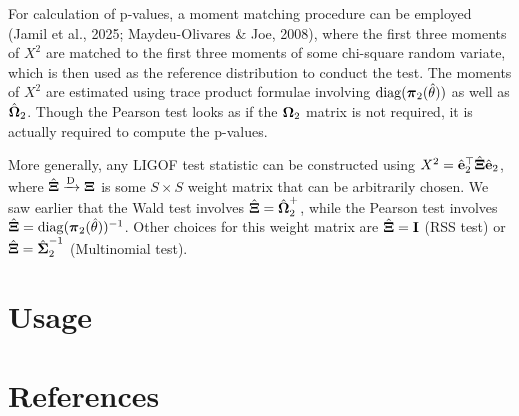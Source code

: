 \documentclass[
  letterpaper,
  DIV=11,
  numbers=noendperiod]{scrartcl}
\begin{document}
For calculation of p-values, a moment matching procedure can be employed
(Jamil et al., 2025; Maydeu-Olivares \& Joe, 2008), where the first
three moments of \(X^2\) are matched to the first three moments of some
chi-square random variate, which is then used as the reference
distribution to conduct the test. The moments of \(X^2\) are estimated
using trace product formulae involving \(\operatorname{diag}({\boldsymbol\pi}_2(\hat\theta))\) as
well as \(\hat{{\boldsymbol\Omega}}_2\). Though the Pearson test looks as if the
\({\boldsymbol\Omega}_2\) matrix is not required, it is actually required to compute
the p-values.

More generally, any LIGOF test statistic can be constructed using
\(X^2 = \hat{{\mathbf e}}_2^\top \hat{{\boldsymbol\Xi}} \hat{{\mathbf e}}_2\), where
\(\hat{{\boldsymbol\Xi}} \xrightarrow{\text D} {\boldsymbol\Xi}\) is some \(S\times S\) weight
matrix that can be arbitrarily chosen. We saw earlier that the Wald test
involves \(\hat{{\boldsymbol\Xi}}=\hat{{\boldsymbol\Omega}}_2^{+}\), while the Pearson test involves
\(\hat{{\boldsymbol\Xi}} = \operatorname{diag}({\boldsymbol\pi}_2(\hat\theta))^{-1}\). Other choices for this
weight matrix are \(\hat{{\boldsymbol\Xi}} = {\mathbf I}\) (RSS test) or
\(\hat{{\boldsymbol\Xi}} = \hat{{\boldsymbol\Sigma}}_2^{-1}\) (Multinomial test).

\section{Usage}\label{usage}

\section*{References}\label{references}
\end{document}
